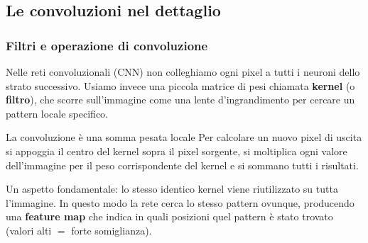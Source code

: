 \documentclass[12pt]{extarticle}
\begin{document}
\subsection{Le convoluzioni nel dettaglio}

\subsubsection{Filtri e operazione di convoluzione}

\noindent Nelle reti convoluzionali (CNN) non colleghiamo ogni pixel a tutti i neuroni dello strato successivo. Usiamo invece una piccola matrice di pesi chiamata \textbf{kernel} (o \textbf{filtro}), che scorre sull'immagine come una lente d'ingrandimento per cercare un pattern locale specifico.

\begin{ideabox}{La convoluzione è una somma pesata locale}
Per calcolare un nuovo pixel di uscita si appoggia il centro del kernel sopra il pixel sorgente, si moltiplica ogni valore dell'immagine per il peso corrispondente del kernel e si sommano tutti i risultati.
\end{ideabox}

\noindent Un aspetto fondamentale: lo stesso identico kernel viene riutilizzato su tutta l'immagine. In questo modo la rete cerca lo stesso pattern ovunque, producendo una \textbf{feature map} che indica in quali posizioni quel pattern è stato trovato (valori alti $=$ forte somiglianza).
\end{document}

